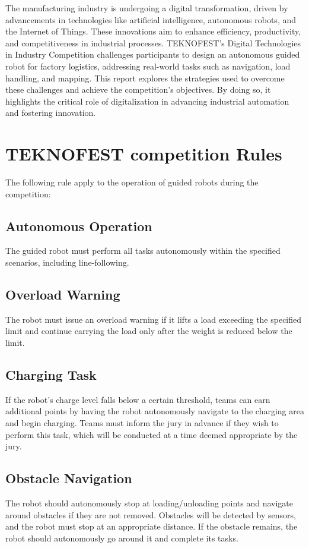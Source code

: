 \documentclass[../../main]{subfiles}
\begin{document}
The manufacturing industry is undergoing a digital transformation, driven by advancements in technologies like artificial intelligence, autonomous robots, and the Internet of Things. These innovations aim to enhance efficiency, productivity, and competitiveness in industrial processes. TEKNOFEST’s Digital Technologies in Industry Competition challenges participants to design an autonomous guided robot for factory logistics, addressing real-world tasks such as navigation, load handling, and mapping. This report explores the strategies used to overcome these challenges and achieve the competition’s objectives. By doing so, it highlights the critical role of digitalization in advancing industrial automation and fostering innovation.

\section{TEKNOFEST competition Rules}
The following rule apply to the operation of guided robots during the competition:

\subsection{ Autonomous Operation}
The guided robot must perform all tasks autonomously within the specified scenarios, including line-following.

\subsection{Overload Warning}
The robot must issue an overload warning if it lifts a load exceeding the specified limit and continue carrying the load only after the weight is reduced below the limit.
\newpage
\subsection{Charging Task}
If the robot's charge level falls below a certain threshold, teams can earn additional points by having the robot autonomously navigate to the charging area and begin charging. Teams must inform the jury in advance if they wish to perform this task, which will be conducted at a time deemed appropriate by the jury.

\subsection{Obstacle Navigation}
The robot should autonomously stop at loading/unloading points and navigate around obstacles if they are not removed. Obstacles will be detected by sensors, and the robot must stop at an appropriate distance. If the obstacle remains, the robot should autonomously go around it and complete its tasks.
\end{document}
